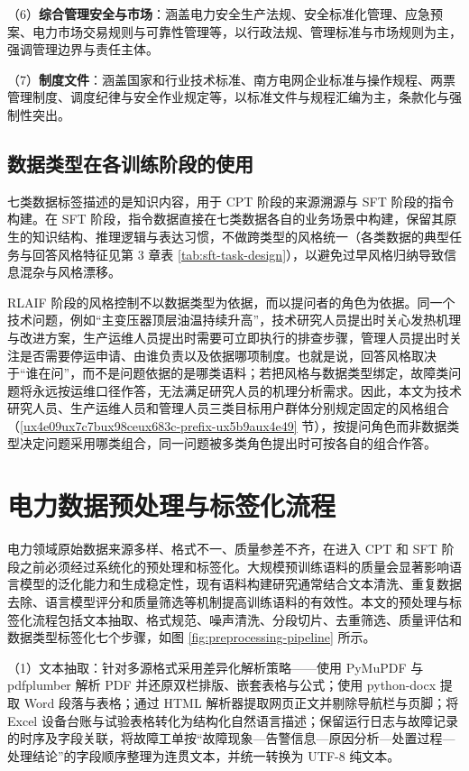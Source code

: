 \documentclass[fontset=fandol,type=master,campus=shenzhen,etitleauto=true]{hithesisbook}
\begin{document}
\noindent （6）\textbf{综合管理安全与市场}：涵盖电力安全生产法规、安全标准化管理、应急预案、电力市场交易规则与可靠性管理等，以行政法规、管理标准与市场规则为主，强调管理边界与责任主体。

\noindent （7）\textbf{制度文件}：涵盖国家和行业技术标准、南方电网企业标准与操作规程、两票管理制度、调度纪律与安全作业规定等，以标准文件与规程汇编为主，条款化与强制性突出。

\subsection{数据类型在各训练阶段的使用}\label{subsec:data-mapping}

七类数据标签描述的是知识内容，用于 CPT 阶段的来源溯源与 SFT 阶段的指令构建。在 SFT 阶段，指令数据直接在七类数据各自的业务场景中构建，保留其原生的知识结构、推理逻辑与表达习惯，不做跨类型的风格统一（各类数据的典型任务与回答风格特征见第 3 章表 \ref{tab:sft-task-design}），以避免过早风格归纳导致信息混杂与风格漂移。

RLAIF 阶段的风格控制不以数据类型为依据，而以提问者的角色为依据。同一个技术问题，例如“主变压器顶层油温持续升高”，技术研究人员提出时关心发热机理与改进方案，生产运维人员提出时需要可立即执行的排查步骤，管理人员提出时关注是否需要停运申请、由谁负责以及依据哪项制度。也就是说，回答风格取决于“谁在问”，而不是问题依据的是哪类语料；若把风格与数据类型绑定，故障类问题将永远按运维口径作答，无法满足研究人员的机理分析需求。因此，本文为技术研究人员、生产运维人员和管理人员三类目标用户群体分别规定固定的风格组合（\ref{ux4e09ux7c7bux98ceux683c-prefix-ux5b9aux4e49} 节），按提问角色而非数据类型决定问题采用哪类组合，同一问题被多类角色提出时可按各自的组合作答。

\section{电力数据预处理与标签化流程}\label{sec:preprocess}

电力领域原始数据来源多样、格式不一、质量参差不齐，在进入 CPT 和 SFT 阶段之前必须经过系统化的预处理和标签化。大规模预训练语料的质量会显著影响语言模型的泛化能力和生成稳定性，现有语料构建研究通常结合文本清洗、重复数据去除、语言模型评分和质量筛选等机制提高训练语料的有效性\cite{ref56,ref57,ref58}。本文的预处理与标签化流程包括文本抽取、格式规范、噪声清洗、分段切片、去重筛选、质量评估和数据类型标签化七个步骤，如图 \ref{fig:preprocessing-pipeline} 所示。

\noindent （1）文本抽取：针对多源格式采用差异化解析策略——使用 PyMuPDF 与 pdfplumber 解析 PDF 并还原双栏排版、嵌套表格与公式；使用 python-docx 提取 Word 段落与表格；通过 HTML 解析器提取网页正文并剔除导航栏与页脚；将 Excel 设备台账与试验表格转化为结构化自然语言描述；保留运行日志与故障记录的时序及字段关联，将故障工单按“故障现象—告警信息—原因分析—处置过程—处理结论”的字段顺序整理为连贯文本，并统一转换为 UTF-8 纯文本。
\end{document}
